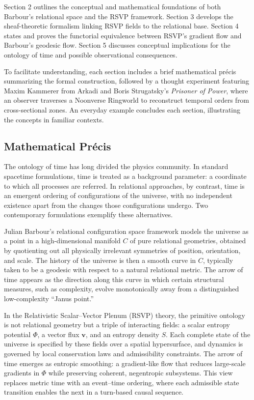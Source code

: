 \documentclass[11pt]{article}
\theoremstyle{plain}
\theoremstyle{definition}
\begin{document}
Section 2 outlines the conceptual and mathematical foundations of both Barbour’s relational space and the RSVP framework. Section 3 develops the sheaf-theoretic formalism linking RSVP fields to the relational base. Section 4 states and proves the functorial equivalence between RSVP’s gradient flow and Barbour’s geodesic flow. Section 5 discusses conceptual implications for the ontology of time and possible observational consequences.

To facilitate understanding, each section includes a brief mathematical précis summarizing the formal construction, followed by a thought experiment featuring Maxim Kammerer from Arkadi and Boris Strugatsky's \textit{Prisoner of Power}, where an observer traverses a Noonverse Ringworld to reconstruct temporal orders from cross-sectional zones. An everyday example concludes each section, illustrating the concepts in familiar contexts.

\subsection{Mathematical Précis}
The ontology of time has long divided the physics community. In standard spacetime formulations, time is treated as a background parameter: a coordinate to which all processes are referred. In relational approaches, by contrast, time is an emergent ordering of configurations of the universe, with no independent existence apart from the changes those configurations undergo. Two contemporary formulations exemplify these alternatives.

Julian Barbour’s relational configuration space framework models the universe as a point in a high-dimensional manifold $C$ of pure relational geometries, obtained by quotienting out all physically irrelevant symmetries of position, orientation, and scale. The history of the universe is then a smooth curve in $C$, typically taken to be a geodesic with respect to a natural relational metric. The arrow of time appears as the direction along this curve in which certain structural measures, such as complexity, evolve monotonically away from a distinguished low-complexity “Janus point.”

In the Relativistic Scalar–Vector Plenum (RSVP) theory, the primitive ontology is not relational geometry but a triple of interacting fields: a scalar entropy potential $\Phi$, a vector flux $\mathbf{v}$, and an entropy density $S$. Each complete state of the universe is specified by these fields over a spatial hypersurface, and dynamics is governed by local conservation laws and admissibility constraints. The arrow of time emerges as entropic smoothing: a gradient-like flow that reduces large-scale gradients in $\Phi$ while preserving coherent, negentropic subsystems. This view replaces metric time with an event–time ordering, where each admissible state transition enables the next in a turn-based causal sequence.
\end{document}
